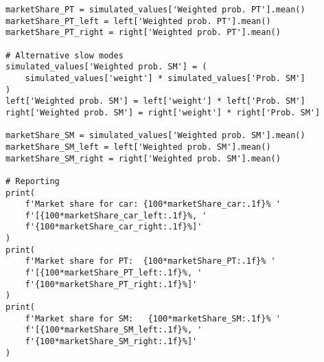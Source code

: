 \documentclass[12pt,a4paper]{article}
\begin{document}
\begin{lstlisting}[style=numbers]
marketShare_PT = simulated_values['Weighted prob. PT'].mean()
marketShare_PT_left = left['Weighted prob. PT'].mean()
marketShare_PT_right = right['Weighted prob. PT'].mean()

# Alternative slow modes
simulated_values['Weighted prob. SM'] = (
    simulated_values['weight'] * simulated_values['Prob. SM']
)
left['Weighted prob. SM'] = left['weight'] * left['Prob. SM']
right['Weighted prob. SM'] = right['weight'] * right['Prob. SM']

marketShare_SM = simulated_values['Weighted prob. SM'].mean()
marketShare_SM_left = left['Weighted prob. SM'].mean()
marketShare_SM_right = right['Weighted prob. SM'].mean()

# Reporting
print(
    f'Market share for car: {100*marketShare_car:.1f}% '
    f'[{100*marketShare_car_left:.1f}%, '
    f'{100*marketShare_car_right:.1f}%]'
)
print(
    f'Market share for PT:  {100*marketShare_PT:.1f}% '
    f'[{100*marketShare_PT_left:.1f}%, '
    f'{100*marketShare_PT_right:.1f}%]'
)
print(
    f'Market share for SM:   {100*marketShare_SM:.1f}% '
    f'[{100*marketShare_SM_left:.1f}%, '
    f'{100*marketShare_SM_right:.1f}%]'
)
\end{lstlisting}
\end{document}
